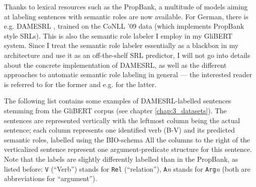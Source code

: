 


Thanks to lexical resources such as the PropBank, a multitude of models
aiming at labeling sentences with semantic roles are now available. For
German, there is e.g. DAMESRL \citep{do2018flexible}, trained on the CoNLL
'09 \citep{hajivc2009conll} data (which implements PropBank style SRLs).
This is also the semantic role labeler I employ in my GliBERT system.
Since I treat the semantic role labeler essentially as a blackbox in my
architecture and use it as an off-the-shelf SRL predictor, I will not go
into details about the concrete implementation of DAMESRL, as well as the
different approaches to automatic semantic role labeling in general ---
the interested reader is referred to \cite{do2018flexible} for the former
and e.g. \cite{palmer2010semantic} for the latter.

The following list contains some examples of DAMESRL-labelled sentences stemming from the
GliBERT corpus (see chapter \ref{chap:3_datasets}). The sentences are represented vertically
with the leftmost column being the actual sentence; each column represents one identified verb
(B-V) and its predicted semantic roles, labelled using the BIO-schema All the columns to the right of the verticalized sentence
represent one argument-predicate structure for this sentence. Note that the labels are slightly
differently labelled than in the PropBank, as listed before: \texttt{V} (``Verb'') stands for
\texttt{Rel} (``relation''), \texttt{A}\textit{n} stands for \texttt{Arg}\textit{n} (both are
abbreviations for ``argument'').

